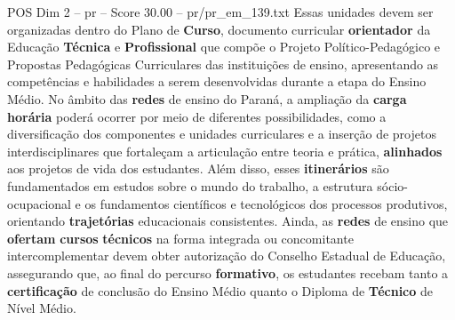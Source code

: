 \begin{textsample}{POS Dim 2 – pr – Score 30.00 – pr/pr\_em\_139.txt}
Essas unidades devem ser organizadas dentro do Plano de \textbf{Curso}, documento curricular \textbf{orientador} da Educação \textbf{Técnica} e \textbf{Profissional} que compõe o Projeto Político-Pedagógico e Propostas Pedagógicas Curriculares das instituições de ensino, apresentando as competências e habilidades a serem desenvolvidas durante a etapa do Ensino Médio.
No âmbito das \textbf{redes} de ensino do Paraná, a ampliação da \textbf{carga} \textbf{horária} poderá ocorrer por meio de diferentes possibilidades, como a diversificação dos componentes e unidades curriculares e a inserção de projetos interdisciplinares que fortaleçam a articulação entre teoria e prática, \textbf{alinhados} aos projetos de vida dos estudantes.
Além disso, esses \textbf{itinerários} são fundamentados em estudos sobre o mundo do trabalho, a estrutura sócio-ocupacional e os fundamentos científicos e tecnológicos dos processos produtivos, orientando \textbf{trajetórias} educacionais consistentes.
Ainda, as \textbf{redes} de ensino que \textbf{ofertam} \textbf{cursos} \textbf{técnicos} na forma integrada ou concomitante intercomplementar devem obter autorização do Conselho Estadual de Educação, assegurando que, ao final do percurso \textbf{formativo}, os estudantes recebam tanto a \textbf{certificação} de conclusão do Ensino Médio quanto o Diploma de \textbf{Técnico} de Nível Médio.

\end{textsample}
